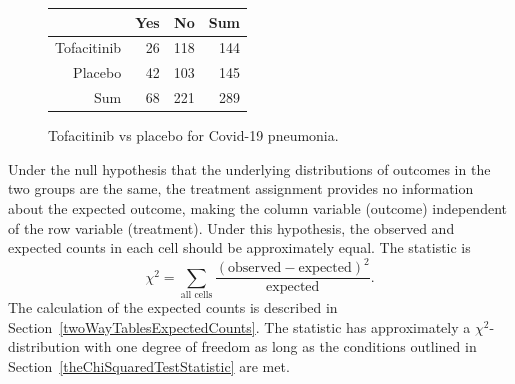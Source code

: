 \begin{figure}[ht]
\centering
\begin{tabular}{rrrr}
  \hline
 & Yes & No & Sum \\ 
  \hline
Tofacitinib & 26 & 118 & 144 \\ 
  Placebo & 42 & 103 & 145 \\ 
  Sum & 68 & 221 & 289 \\ 
   \hline
\end{tabular}
\caption{Tofacitinib vs placebo for Covid-19 pneumonia.} 
\label{tofacitinibVsPlaceboTable}
\end{figure}

Under the null hypothesis that the underlying distributions of outcomes in the two groups are the same, the treatment assignment provides no information about the expected outcome, making the column variable (outcome) independent of the row variable (treatment). Under this hypothesis, the observed and expected counts in each cell should be approximately equal.  The statistic is 
\[\chi^2 = \sum_{\text{all cells}} \frac{(\text{observed} - \text{expected})^2}{\text{expected}}. \]
The calculation of the expected counts is described in Section~\ref{twoWayTablesExpectedCounts}.
The statistic has approximately a $\chi^2$-distribution with one degree of freedom as long as the conditions outlined in Section~\ref{theChiSquaredTestStatistic} are met.

